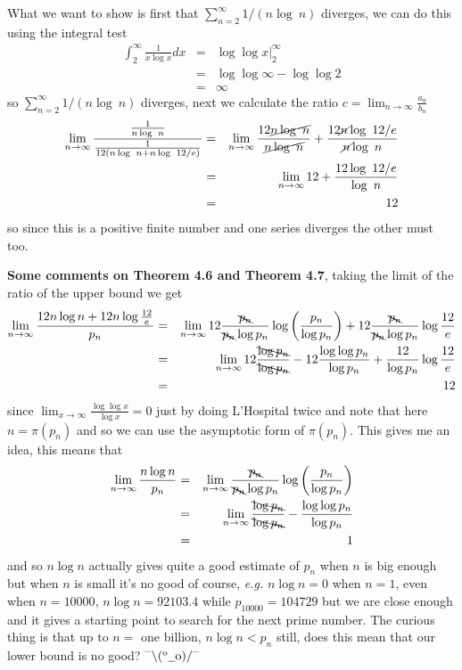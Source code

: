 \documentclass[aps,preprint,preprintnumbers,nofootinbib,showpacs,prd]{revtex4-1}
\newcommand{\eg}{{\it e.g.} }
\newcommand{\nbea}{\begin{eqnarray*}}
\newcommand{\neea}{\end{eqnarray*}}
\newcommand{\dunno}{$ {}^{\mbox {--}}\backslash(^{\rm o}{}\underline{\hspace{0.2cm}}{\rm o})/^{\mbox {--}}$}
\begin{document}
What we want to show is first that $\sum_{n=2}^{\infty} 1/(n \log~n)$ diverges, we can do this using the integral test
%
\nbea
\int_2^\infty \frac{1}{x \log x} dx & = & \left . \log \log x \right |_2^{\infty} \\
& = & \log \log \infty - \log \log 2 \\
& = & \infty
\neea
%
so $\sum_{n=2}^{\infty} 1/(n \log~n)$ diverges, next we calculate the ratio $c = \lim_{n\to\infty}\frac{a_n}{b_n}$
%
\nbea
\lim_{n\to\infty} \frac{\frac{1}{n\log~n}}{\frac{1}{12(n\log~n + n\log~12/e)}} & = & \lim_{n\to\infty} \frac{12 \cancel{n \log~n}}{\cancel{n\log~n}} + \frac{12\cancel{n}\log~12/e}{\cancel{n}\log~n} \\
& = & \lim_{n\to\infty} 12 + \frac{12 \log~12/e}{\log~n} \\
& = & 12
\neea
%
so since this is a positive finite number and one series diverges the other must too.

{\bf Some comments on Theorem 4.6 and Theorem 4.7}, taking the limit of the ratio of the upper bound we get
%
\nbea
\lim_{n\to\infty} \frac{12 n \log n + 12 n \log\frac{12}{e}}{p_n} & = & \lim_{n\to\infty} 12 \frac{\bcancel{p_n}}{\bcancel{p_n}\log p_n} \log \left ( \frac{p_n}{\log p_n}\right ) + 12 \frac{\bcancel{p_n}}{\bcancel{p_n}\log p_n} \log\frac{12}{e} \\
& = & \lim_{n\to\infty} 12 \frac{\bcancel{\log p_n}}{\bcancel{\log p_n}} - 12 \frac{\log \log p_n}{\log p_n} + \frac{12}{\log p_n} \log\frac{12}{e} \\
& = & 12
\neea
%
since $\lim_{x\to\infty} \frac{\log\log x}{\log x} = 0$ just by doing L'Hospital twice and note that here $n=\pi(p_n)$ and so we can use the asymptotic form of $\pi(p_n)$. This gives me an idea, this means that
%
\nbea
\lim_{n\to\infty} \frac{n \log n}{p_n} & = & \lim_{n\to\infty} \frac{\bcancel{p_n}}{\bcancel{p_n}\log p_n} \log \left ( \frac{p_n}{\log p_n}\right ) \\
& = & \lim_{n\to\infty} \frac{\bcancel{\log p_n}}{\bcancel{\log p_n}} - \frac{\log \log p_n}{\log p_n} \\
& = & 1
\neea
%
and so $n\log n$ actually gives quite a good estimate of $p_n$ when $n$ is big enough but when $n$ is small it's no good of course, \eg $n\log n=0$ when $n=1$, even when $n=10000$, $n\log n = 92103.4$ while $p_{10000} = 104729$ but we are close enough and it gives a starting point to search for the next prime number. The curious thing is that up to $n=$ one billion, $n\log n < p_n$ still, does this mean that our lower bound is no good? \dunno
\end{document}
